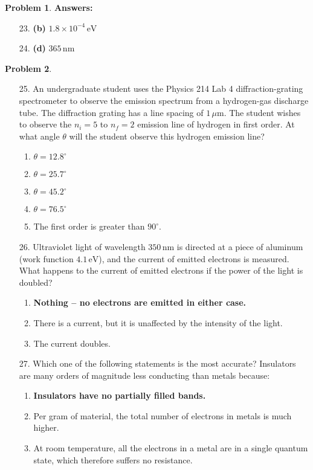 \documentclass[12pt]{article}
\theoremstyle{definition} %
\newtheorem{problem}{Problem}
\theoremstyle{plain} %
\begin{document}
\begin{problem}
    \textbf{Answers:}
    \begin{enumerate}
        \item[23.] \textbf{(b)} \(1.8 \times 10^{-4} \, \text{eV}\)
        \item[24.] \textbf{(d)} \(365 \, \text{nm}\)
    \end{enumerate}
    
\end{problem}
\begin{problem}
    \begin{enumerate}
        \item[25.] An undergraduate student uses the Physics 214 Lab 4 diffraction-grating spectrometer to observe the emission spectrum from a hydrogen-gas discharge tube. The diffraction grating has a line spacing of \(1 \, \mu\text{m}\). The student wishes to observe the \(n_i = 5\) to \(n_f = 2\) emission line of hydrogen in first order. At what angle \(\theta\) will the student observe this hydrogen emission line?
        \begin{enumerate}
            \item \(\theta = 12.8^\circ\)
            \item \textbf{\(\theta = 25.7^\circ\)}
            \item \(\theta = 45.2^\circ\)
            \item \(\theta = 76.5^\circ\)
            \item The first order is greater than \(90^\circ\).
        \end{enumerate}
    
        \item[26.] Ultraviolet light of wavelength \(350 \, \text{nm}\) is directed at a piece of aluminum (work function \(4.1 \, \text{eV}\)), and the current of emitted electrons is measured. What happens to the current of emitted electrons if the power of the light is doubled?
        \begin{enumerate}
            \item \textbf{Nothing – no electrons are emitted in either case.}
            \item There is a current, but it is unaffected by the intensity of the light.
            \item The current doubles.
        \end{enumerate}
    
        \item[27.] Which one of the following statements is the most accurate? Insulators are many orders of magnitude less conducting than metals because:
        \begin{enumerate}
            \item \textbf{Insulators have no partially filled bands.}
            \item Per gram of material, the total number of electrons in metals is much higher.
            \item At room temperature, all the electrons in a metal are in a single quantum state, which therefore suffers no resistance.
        \end{enumerate}
    \end{enumerate}
    

\end{problem}
\end{document}
